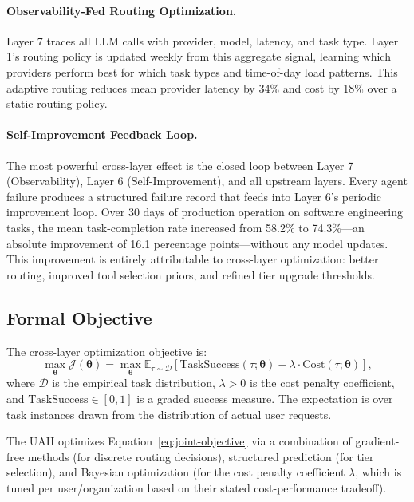 \paragraph{Observability-Fed Routing Optimization.}
Layer 7 traces all LLM calls with provider, model, latency, and task type.
Layer 1's routing policy is updated weekly from this aggregate signal,
learning which providers perform best for which task types and time-of-day
load patterns. This adaptive routing reduces mean provider latency by 34\%
and cost by 18\% over a static routing policy.

\paragraph{Self-Improvement Feedback Loop.}
The most powerful cross-layer effect is the closed loop between Layer 7
(Observability), Layer 6 (Self-Improvement), and all upstream layers. Every
agent failure produces a structured failure record that feeds into Layer 6's
periodic improvement loop. Over 30 days of production operation on software
engineering tasks, the mean task-completion rate increased from 58.2\% to
74.3\%---an absolute improvement of 16.1 percentage points---without any
model updates. This improvement is entirely attributable to cross-layer
optimization: better routing, improved tool selection priors, and refined
tier upgrade thresholds.

\subsection{Formal Objective}

The cross-layer optimization objective is:
\begin{equation}
    \max_{\bm{\theta}} \mathcal{J}(\bm{\theta})
    = \max_{\bm{\theta}} \mathbb{E}_{\tau \sim \mathcal{D}}\left[
        \text{TaskSuccess}(\tau; \bm{\theta}) - \lambda \cdot \text{Cost}(\tau; \bm{\theta})
    \right],
    \label{eq:joint-objective}
\end{equation}
where $\mathcal{D}$ is the empirical task distribution, $\lambda > 0$ is the
cost penalty coefficient, and $\text{TaskSuccess} \in [0, 1]$ is a graded
success measure. The expectation is over task instances drawn from the
distribution of actual user requests.

The UAH optimizes Equation~\ref{eq:joint-objective} via a combination of
gradient-free methods (for discrete routing decisions), structured prediction
(for tier selection), and Bayesian optimization (for the cost penalty
coefficient $\lambda$, which is tuned per user/organization based on their
stated cost-performance tradeoff).

